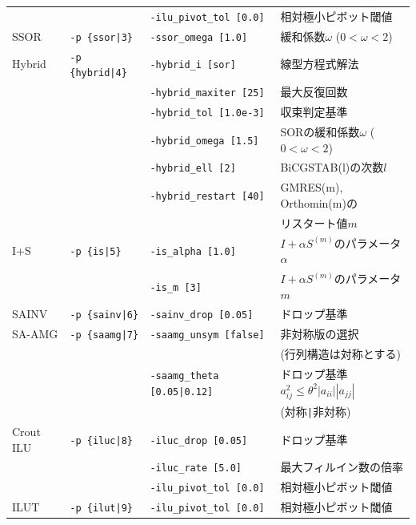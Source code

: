 \documentclass[a4paper]{jarticle}
\begin{document}
{{\begin{minipage}[t]{\textwidth}
\begin{center}
\begin{tabular}{l|lll}
         &                       & \verb=-ilu_pivot_tol [0.0]= & 相対極小ピボット閾値 \\
SSOR     & \verb=-p {ssor|3}=    & \verb=-ssor_omega [1.0]=    & 緩和係数$\omega$ ($0<\omega<2$) \\
Hybrid   & \verb=-p {hybrid|4}=  & \verb=-hybrid_i [sor]=  & 線型方程式解法 \\
         &                       & \verb=-hybrid_maxiter [25]= & 最大反復回数 \\
         &                       & \verb=-hybrid_tol [1.0e-3]= & 収束判定基準 \\
         &                       & \verb=-hybrid_omega [1.5]=  & SORの緩和係数$\omega$ ($0<\omega<2$) \\
         &                       & \verb=-hybrid_ell [2]=      & BiCGSTAB(l)の次数$l$\\
         &                       & \verb=-hybrid_restart [40]= & GMRES(m), Orthomin(m)の \\
         &                       &                             & リスタート値$m$ \\
I+S      & \verb=-p {is|5}=      & \verb=-is_alpha [1.0]=  & $I+\alpha S^{(m)}$のパラメータ$\alpha$ \\
         &                       & \verb=-is_m [3]=        & $I+\alpha S^{(m)}$のパラメータ$m$ \\
SAINV    & \verb=-p {sainv|6}=   & \verb=-sainv_drop [0.05]=    & ドロップ基準\\
SA-AMG   & \verb=-p {saamg|7}=   & \verb=-saamg_unsym [false]=     & 非対称版の選択 \\
         &                       &                                 & (行列構造は対称とする) \\
         &                       & \verb=-saamg_theta [0.05|0.12]= & ドロップ基準 $a^2_{ij}\le\theta^2|a_{ii}||a_{jj}|$ \\
         &                       &                             & (対称\verb=|=非対称) \\
Crout ILU& \verb=-p {iluc|8}=    & \verb=-iluc_drop [0.05]=    & ドロップ基準    \\
         &                       & \verb=-iluc_rate [5.0]=     & 最大フィルイン数の倍率 \\
         &                       & \verb=-ilu_pivot_tol [0.0]= & 相対極小ピボット閾値 \\
ILUT     & \verb=-p {ilut|9}=    & \verb=-ilu_pivot_tol [0.0]= & 相対極小ピボット閾値 \\

\end{tabular}
\end{center}
\end{minipage}}}
\end{document}
